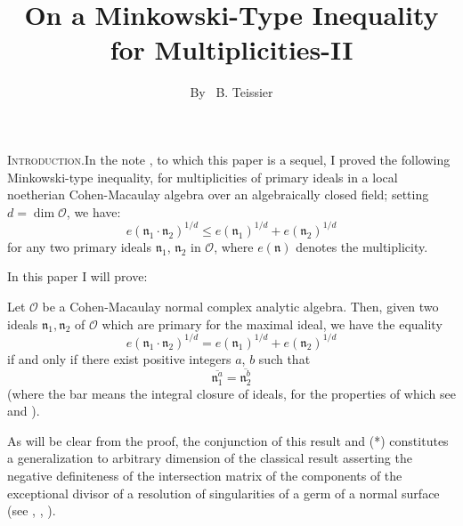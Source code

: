 \title{On a Minkowski-Type Inequality for Multiplicities-II}\label{art06}       

\author{By~ B. Teissier}

\date{}
\maketitle

\setcounter{page}{407}

\setcounter{pageoriginal}{346}
\textsc{Introduction.}\pageoriginale In the note \cite{art06-keyM.I.}, to which this paper is a sequel, I proved the following Minkowski-type inequality, for multiplicities of primary ideals in a local noetherian Cohen-Macaulay algebra over an algebraically closed field; setting $d = \dim \mathcal{O}$, we have:
\begin{equation*}
e(\mathfrak{n}_1 \cdot \mathfrak{n}_2)^{1/d} \leqslant e(\mathfrak{n}_1)^{1/d} + e(\mathfrak{n}_2)^{1/d} \tag{*}
\end{equation*}
for any two primary ideals $\mathfrak{n}_1$, $\mathfrak{n}_2$ in $\mathcal{O}$, where $e(\mathfrak{n})$ denotes the multiplicity.

In this paper I will prove:

\begin{theorem}\label{art06-thm1}
Let $\mathcal{O}$ be a Cohen-Macaulay normal complex analytic algebra. Then, given two ideals $\mathfrak{n}_1, \mathfrak{n}_2$ of $\mathcal{O}$ which are primary for the maximal ideal, we have the equality
$$
e(\mathfrak{n}_1 \cdot \mathfrak{n}_2)^{1/d} =e(\mathfrak{n}_1)^{1/d}  + e(\mathfrak{n}_2)^{1/d}
$$
if and only if there exist positive integers $a$, $b$ such that 
$$
\overline{\mathfrak{n}^a_1} = \overline{\mathfrak{n}^b_2}
$$
(where the bar means the integral closure of ideals, for the properties of which see {\em \cite{art06-keyC.E.W.}} and {\em \cite{art06-keyL.T.}}).
\end{theorem}

As will be clear from the proof, the conjunction of this result and (*) constitutes a generalization to arbitrary dimension of the classical result asserting the negative definiteness of the intersection matrix of the components of the exceptional divisor of a resolution of singularities of a germ of a normal surface (see \cite{art06-keyDV}, \cite{art06-keyM}, \cite{art06-keyLi}).

